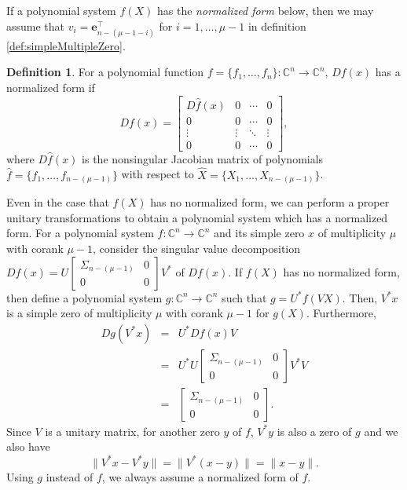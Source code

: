 \documentclass[12pt,oneside,reqno]{amsart}
\theoremstyle{definition}
\newtheorem{defi}[thm]{Definition}
\newcommand{\CC}{\mathbb{C}}
\begin{document}
If a polynomial system $f(X)$ has the {\it normalized form} below, then we may assume that $v_i=\mathbf{e}_{n-(\mu-1-i)}^\top$ for $i=1,\dots, \mu-1$ in definition \ref{def:simpleMultipleZero}.
\begin{defi}
	For a polynomial function $f=\{f_1,\dots, f_n\}:\mathbb{C}^n\rightarrow\mathbb{C}^n$, $Df(x)$ has a normalized form if 
	\[Df(x)=\begin{bmatrix}
	D\hat{f}(x) & 0 & \cdots & 0\\
	0 & 0 & \cdots & 0 \\
	\vdots & \vdots & \ddots & \vdots \\
	0 & 0 & \cdots & 0
	\end{bmatrix},\label{eq:normalizedForm}\]
	where $D\hat{f}(x)$ is the nonsingular Jacobian matrix of polynomials $\hat{f}=\{f_1,\dots, f_{n-{(\mu-1)}}\}$ with respect to $\hat{X}=\{X_1,\dots, X_{n-{(\mu-1)}}\}$.
\end{defi}
Even in the case that $f(X)$ has no normalized form, we can perform a proper unitary transformations to obtain a polynomial system which has a normalized form. For a polynomial system $f:\CC^n \rightarrow \CC^n$ and its simple zero $x$ of multiplicity $\mu$ with corank $\mu-1$, consider the singular value decomposition $Df(x)=U\begin{bmatrix}
\Sigma_{n-(\mu-1)} & 0 \\
0 & 0
\end{bmatrix}V^*$ of $Df(x)$. If $f(X)$ has no normalized form, then define a polynomial system $g:\CC^n\rightarrow \CC^n$ such that $g=U^*f(VX)$. Then, $V^*x$ is a simple zero of multiplicity $\mu$ with corank $\mu-1$ for $g(X)$. Furthermore,
\begin{eqnarray*}
Dg(V^*x) & = & U^*Df(x)V\\
& = & U^*U \begin{bmatrix}
	\Sigma_{n-(\mu-1)} & 0 \\
	0 & 0
\end{bmatrix}V^* V \\
& = & \begin{bmatrix}
	\Sigma_{n-(\mu-1)} & 0 \\
	0 & 0
\end{bmatrix}.
\end{eqnarray*}
Since $V$ is a unitary matrix, for another zero $y$ of $f$, $V^*y$ is also a zero of $g$ and we also have
\[\|V^*x-V^*y\|=\|V^*(x-y)\|=\|x-y\|.\]
Using $g$ instead of $f$, we always assume a normalized form of $f$.
\end{document}

